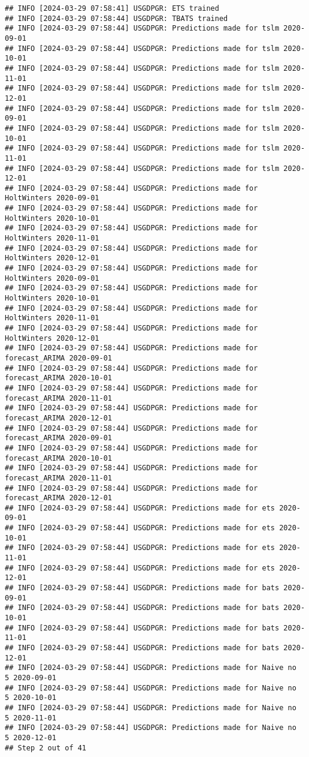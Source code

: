 \documentclass[
]{article}
\begin{document}
\begin{verbatim}
## INFO [2024-03-29 07:58:41] USGDPGR: ETS trained
## INFO [2024-03-29 07:58:44] USGDPGR: TBATS trained
## INFO [2024-03-29 07:58:44] USGDPGR: Predictions made for tslm 2020-09-01
## INFO [2024-03-29 07:58:44] USGDPGR: Predictions made for tslm 2020-10-01
## INFO [2024-03-29 07:58:44] USGDPGR: Predictions made for tslm 2020-11-01
## INFO [2024-03-29 07:58:44] USGDPGR: Predictions made for tslm 2020-12-01
## INFO [2024-03-29 07:58:44] USGDPGR: Predictions made for tslm 2020-09-01
## INFO [2024-03-29 07:58:44] USGDPGR: Predictions made for tslm 2020-10-01
## INFO [2024-03-29 07:58:44] USGDPGR: Predictions made for tslm 2020-11-01
## INFO [2024-03-29 07:58:44] USGDPGR: Predictions made for tslm 2020-12-01
## INFO [2024-03-29 07:58:44] USGDPGR: Predictions made for HoltWinters 2020-09-01
## INFO [2024-03-29 07:58:44] USGDPGR: Predictions made for HoltWinters 2020-10-01
## INFO [2024-03-29 07:58:44] USGDPGR: Predictions made for HoltWinters 2020-11-01
## INFO [2024-03-29 07:58:44] USGDPGR: Predictions made for HoltWinters 2020-12-01
## INFO [2024-03-29 07:58:44] USGDPGR: Predictions made for HoltWinters 2020-09-01
## INFO [2024-03-29 07:58:44] USGDPGR: Predictions made for HoltWinters 2020-10-01
## INFO [2024-03-29 07:58:44] USGDPGR: Predictions made for HoltWinters 2020-11-01
## INFO [2024-03-29 07:58:44] USGDPGR: Predictions made for HoltWinters 2020-12-01
## INFO [2024-03-29 07:58:44] USGDPGR: Predictions made for forecast_ARIMA 2020-09-01
## INFO [2024-03-29 07:58:44] USGDPGR: Predictions made for forecast_ARIMA 2020-10-01
## INFO [2024-03-29 07:58:44] USGDPGR: Predictions made for forecast_ARIMA 2020-11-01
## INFO [2024-03-29 07:58:44] USGDPGR: Predictions made for forecast_ARIMA 2020-12-01
## INFO [2024-03-29 07:58:44] USGDPGR: Predictions made for forecast_ARIMA 2020-09-01
## INFO [2024-03-29 07:58:44] USGDPGR: Predictions made for forecast_ARIMA 2020-10-01
## INFO [2024-03-29 07:58:44] USGDPGR: Predictions made for forecast_ARIMA 2020-11-01
## INFO [2024-03-29 07:58:44] USGDPGR: Predictions made for forecast_ARIMA 2020-12-01
## INFO [2024-03-29 07:58:44] USGDPGR: Predictions made for ets 2020-09-01
## INFO [2024-03-29 07:58:44] USGDPGR: Predictions made for ets 2020-10-01
## INFO [2024-03-29 07:58:44] USGDPGR: Predictions made for ets 2020-11-01
## INFO [2024-03-29 07:58:44] USGDPGR: Predictions made for ets 2020-12-01
## INFO [2024-03-29 07:58:44] USGDPGR: Predictions made for bats 2020-09-01
## INFO [2024-03-29 07:58:44] USGDPGR: Predictions made for bats 2020-10-01
## INFO [2024-03-29 07:58:44] USGDPGR: Predictions made for bats 2020-11-01
## INFO [2024-03-29 07:58:44] USGDPGR: Predictions made for bats 2020-12-01
## INFO [2024-03-29 07:58:44] USGDPGR: Predictions made for Naive no  5 2020-09-01
## INFO [2024-03-29 07:58:44] USGDPGR: Predictions made for Naive no  5 2020-10-01
## INFO [2024-03-29 07:58:44] USGDPGR: Predictions made for Naive no  5 2020-11-01
## INFO [2024-03-29 07:58:44] USGDPGR: Predictions made for Naive no  5 2020-12-01
## Step 2 out of 41
\end{verbatim}
\end{document}
